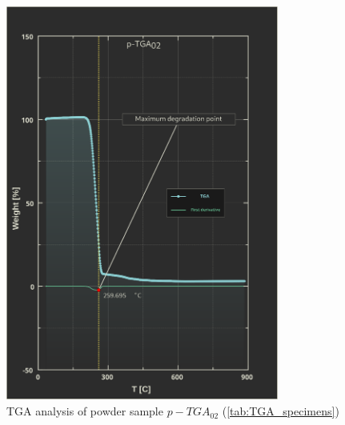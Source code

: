 \documentclass{article}
\begin{document}
            \begin{figure}[h!]
                \centering
                \includegraphics[width=0.8\textwidth]{Pictures/Thermal_analysis_plots/TGA_catalogued/p-TGA02.eps}
                \caption{TGA analysis of powder sample $p-TGA_{02}$ (\ref{tab:TGA_specimens})}
                \label{fig:TGA_02}
            \end{figure}
\end{document}
